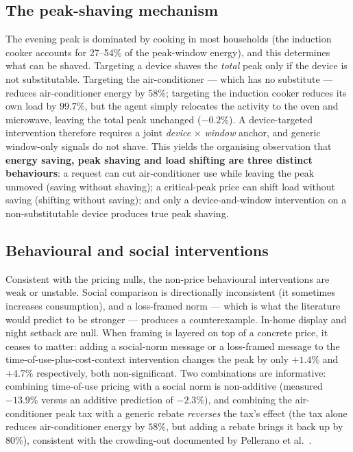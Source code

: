 \documentclass[11pt]{article}
\begin{document}
\subsection{The peak-shaving mechanism}
The evening peak is dominated by cooking in most households (the induction cooker accounts for
27--54\% of the peak-window energy), and this determines what can be shaved. Targeting a device shaves the
\emph{total} peak only if the device is not substitutable. Targeting the air-conditioner --- which has no
substitute --- reduces air-conditioner energy by $58\%$; targeting the induction cooker reduces its own
load by $99.7\%$, but the agent simply relocates the activity to the oven and microwave, leaving the total
peak unchanged ($-0.2\%$). A device-targeted intervention therefore requires a joint \emph{device}
$\times$ \emph{window} anchor, and generic window-only signals do not shave. This yields the organising
observation that \textbf{energy saving, peak shaving and load shifting are three distinct behaviours}: a
request can cut air-conditioner use while leaving the peak unmoved (saving without shaving); a
critical-peak price can shift load without saving (shifting without saving); and only a device-and-window
intervention on a non-substitutable device produces true peak shaving.

\subsection{Behavioural and social interventions}
Consistent with the pricing nulls, the non-price behavioural interventions are weak or unstable. Social
comparison is directionally inconsistent (it sometimes increases consumption), and a loss-framed norm ---
which is what the literature would predict to be stronger --- produces a counterexample. In-home display
and night setback are null. When framing is layered on top of a concrete price, it ceases to matter:
adding a social-norm message or a loss-framed message to the time-of-use-plus-cost-context intervention
changes the peak by only $+1.4\%$ and $+4.7\%$ respectively, both non-significant. Two combinations are
informative: combining time-of-use pricing with a social norm is non-additive (measured $-13.9\%$ versus
an additive prediction of $-2.3\%$), and combining the air-conditioner peak tax with a generic rebate
\emph{reverses} the tax's effect (the tax alone reduces air-conditioner energy by $58\%$, but adding a
rebate brings it back up by $80\%$), consistent with the crowding-out documented by Pellerano et al.\
\cite{pellerano2017}.
\end{document}
